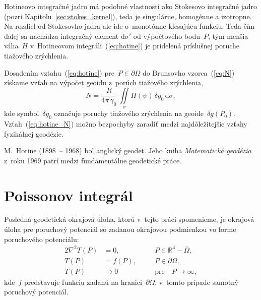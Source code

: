 \documentclass[a4paper, 12pt]{book}
\newcommand{\diff}{\mathrm d}
\begin{document}
Hotineovo integračné jadro má podobné vlastnosti ako Stokesovo integračné jadro 
(pozri Kapitolu~\ref{sec:stokes_kernel}), teda je singulárne, homogénne 
a izotropne.  Na rozdiel od Stokesovho jadra ale ide o~monotónne klesajúcu 
funkciu.  Teda čím ďalej sa nachádza integračný element $\diff\sigma'$ od 
výpočtového bodu~$P$, tým menšia váha~$H$ v~Hotineovom 
integráli~(\ref{eq:hotine}) je pridelená príslušnej poruche tiažového 
zrýchlenia.

Dosadením vzťahu~(\ref{eq:hotine}) pre~$P \in \partial\Omega$ do Brunsovho 
vzorca~(\ref{eq:N}) získame vzťah na výpočet geoidu z~porúch tiažového 
zrýchlenia,
%
\begin{equation}
\label{eq:hotine_N}
N = \frac{R}{4\pi \, \gamma_0} \, \iint\limits_{\sigma} H(\psi) \, \delta g_0 
\, \diff \sigma{,}
\end{equation}
%
kde symbol~$\delta g_0$ označuje poruchy tiažového zrýchlenia na geoide~$\delta 
g(P_0)$.  Vzťah~(\ref{eq:hotine_N}) možno bezpochyby zaradiť medzi 
najdôležitejšie vzťahy fyzikálnej geodézie.

M.~Hotine (1898~-- 1968) bol anglický geodet.  Jeho kniha \textit{Matematická 
geodézia} z~roku 1969 patrí medzi fundamentálne geodetické práce.

\section{Poissonov integrál}
\label{sec:poisson_integral}

Posledná geodetická okrajová úloha, ktorú v~tejto práci spomenieme, je okrajová 
úloha pre poruchový potenciál so zadanou okrajovou podmienkou vo forme 
poruchového potenciálu:
%
\begin{alignat}{2}
\nabla^2 T(P) &= 0{,} &&P \in \mathbb{R}^3 
- \overline\Omega{,}\label{eq:bvp_t_laplace}\\
T(P) &= f(P){,} \quad &&P \in 
\partial\Omega{,}\label{eq:bvp_t_boundary_condition}\\
T(P) &\rightarrow 0 &&\textrm{pre} \quad P \rightarrow 
\infty{,}\label{eq:bvp_t_t_infty}
\end{alignat}
%
kde~$f$ predstavuje funkciu zadanú na hranici~$\partial\Omega$, v~tomto prípade 
samotný poruchový potenciál.
\end{document}
